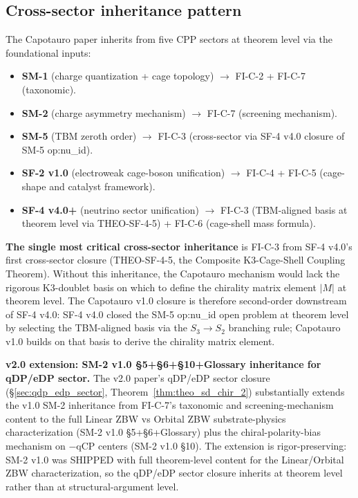 \documentclass[11pt,letterpaper]{article}
\newcommand{\Sthree}{S_3}
\begin{document}
\subsection{Cross-sector inheritance pattern}\label{sec:cross_sector_inheritance}

The Capotauro paper inherits from five CPP sectors at theorem level via the foundational inputs:

\begin{itemize}\setlength\itemsep{0.2em}
    \item \textbf{SM-1} (charge quantization + cage topology) $\to$ FI-C-2 + FI-C-7 (taxonomic).
    \item \textbf{SM-2} (charge asymmetry mechanism) $\to$ FI-C-7 (screening mechanism).
    \item \textbf{SM-5} (TBM zeroth order) $\to$ FI-C-3 (cross-sector via SF-4 v4.0 closure of SM-5 op:nu\_id).
    \item \textbf{SF-2 v1.0} (electroweak cage-boson unification) $\to$ FI-C-4 + FI-C-5 (cage-shape and catalyst framework).
    \item \textbf{SF-4 v4.0+} (neutrino sector unification) $\to$ FI-C-3 (TBM-aligned basis at theorem level via THEO-SF-4-5) + FI-C-6 (cage-shell mass formula).
\end{itemize}

\textbf{The single most critical cross-sector inheritance} is FI-C-3 from SF-4 v4.0's first cross-sector closure (THEO-SF-4-5, the Composite K3-Cage-Shell Coupling Theorem). Without this inheritance, the Capotauro mechanism would lack the rigorous K3-doublet basis on which to define the chirality matrix element $|M|$ at theorem level. The Capotauro v1.0 closure is therefore second-order downstream of SF-4 v4.0: SF-4 v4.0 closed the SM-5 op:nu\_id open problem at theorem level by selecting the TBM-aligned basis via the $\Sthree \to S_2$ branching rule; Capotauro v1.0 builds on that basis to derive the chirality matrix element.

\textbf{v2.0 extension: SM-2 v1.0 \S5+\S6+\S10+Glossary inheritance for qDP/eDP sector.} The v2.0 paper's qDP/eDP sector closure (\S\ref{sec:qdp_edp_sector}, Theorem~\ref{thm:theo_sd_chir_2}) substantially extends the v1.0 SM-2 inheritance from FI-C-7's taxonomic and screening-mechanism content to the full Linear ZBW vs Orbital ZBW substrate-physics characterization (SM-2 v1.0 \S5+\S6+Glossary) plus the chiral-polarity-bias mechanism on $-$qCP centers (SM-2 v1.0 \S10). The extension is rigor-preserving: SM-2 v1.0 was SHIPPED with full theorem-level content for the Linear/Orbital ZBW characterization, so the qDP/eDP sector closure inherits at theorem level rather than at structural-argument level.
\end{document}
